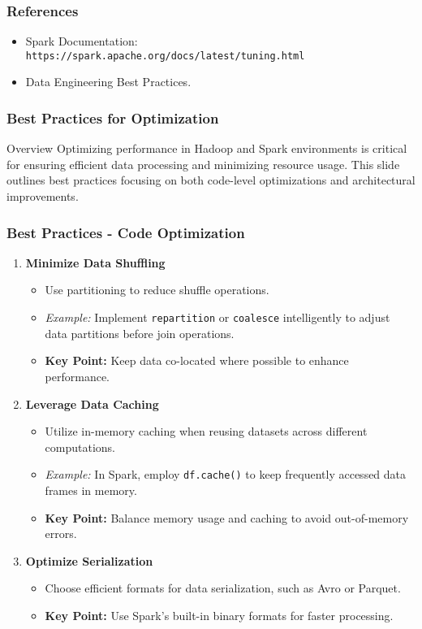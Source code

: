 \documentclass[aspectratio=169]{beamer}
\begin{document}
\begin{frame}
    \frametitle{References}
    \begin{itemize}
        \item Spark Documentation: \texttt{https://spark.apache.org/docs/latest/tuning.html}
        \item Data Engineering Best Practices.
    \end{itemize}
\end{frame}

\begin{frame}
    \frametitle{Best Practices for Optimization}
    \begin{block}{Overview}
        Optimizing performance in Hadoop and Spark environments is critical for ensuring efficient data processing and minimizing resource usage. 
        This slide outlines best practices focusing on both code-level optimizations and architectural improvements.
    \end{block}
\end{frame}

\begin{frame}[fragile]
    \frametitle{Best Practices - Code Optimization}
    \begin{enumerate}
        \item \textbf{Minimize Data Shuffling}
        \begin{itemize}
            \item Use partitioning to reduce shuffle operations.
            \item \textit{Example:} Implement \texttt{repartition} or \texttt{coalesce} intelligently to adjust data partitions before join operations.
            \item \textbf{Key Point:} Keep data co-located where possible to enhance performance.
        \end{itemize}

        \item \textbf{Leverage Data Caching}
        \begin{itemize}
            \item Utilize in-memory caching when reusing datasets across different computations.
            \item \textit{Example:} In Spark, employ \texttt{df.cache()} to keep frequently accessed data frames in memory.
            \item \textbf{Key Point:} Balance memory usage and caching to avoid out-of-memory errors.
        \end{itemize}

        \item \textbf{Optimize Serialization}
        \begin{itemize}
            \item Choose efficient formats for data serialization, such as Avro or Parquet.
            \item \textbf{Key Point:} Use Spark’s built-in binary formats for faster processing.
        \end{itemize}
    \end{enumerate}
\end{frame}
\end{document}
